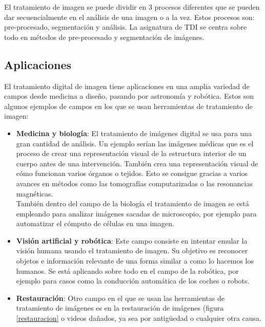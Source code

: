 El tratamiento de imagen se puede dividir en 3 procesos diferentes que se pueden dar secuencialmente en el análisis de una imagen o a la vez. Estos procesos son: pre-procesado, segmentación y análisis. La asignatura de TDI se centra sobre todo en métodos de pre-procesado y segmentación de imágenes.\\ 

\subsection{Aplicaciones}
El tratamiento digital de imagen tiene aplicaciones en una amplia variedad de campos desde medicina a diseño, pasando por astronomía y robótica.  Estos son algunos ejemplos de campos en los que se usan herramientas de tratamiento de imagen:
\begin{itemize}
\item \textbf{Medicina y biología}: El tratamiento de imágenes digital se usa para una gran cantidad de análisis. Un ejemplo serían las imágenes médicas que es el proceso de crear una representación visual de la estructura interior de un cuerpo antes de una intervención. También crea una representación visual de cómo funcionan varios órganos o tejidos. Esto se consigue gracias a varios avances en métodos como las tomografías computarizadas o las resonancias magnéticas.\\

También dentro del campo de la biología el tratamiento de imagen se está empleando para analizar imágenes sacadas de microscopio, por ejemplo para automatizar el cómputo de células en una imagen.\\

\item \textbf{Visión artificial y robótica}: Este campo consiste en intentar emular la visión humana usando el tratamiento de imagen. Su objetivo es reconocer objetos e información relevante de una forma similar a como lo hacemos los humanos. Se está aplicando sobre todo en el campo de la robótica, por ejemplo para casos como la conducción automática de los coches o robots.\\

\item \textbf{Restauración}: Otro campo en el que se usan las herramientas de tratamiento de imágenes es en la restauración de imágenes (figura \ref{restauracion} o videos dañados, ya sea por antigüedad o cualquier otra causa. \\


\end{itemize}
